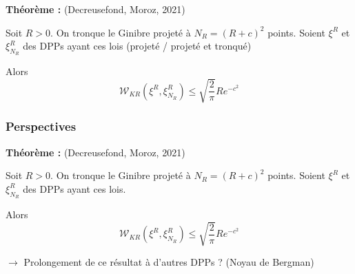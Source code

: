 \documentclass{beamer}
\begin{document}
\begin{frame}
    \bigskip

    \textbf{Théorème :} (Decreusefond, Moroz, 2021)
    
    Soit $R > 0$. On tronque le Ginibre projeté à $ N_R = (R+c)^2 $ points. Soient $ \xi^R $ et $ \xi^R_{N_R} $ des DPPs ayant ces lois (projeté / projeté et tronqué)

    Alors $$ \mathcal W_{KR}(\xi^R, \xi^R_{N_R}) \leqslant \sqrt{\frac{2}{\pi}} R e^{-c^2} $$

\end{frame}\begin{frame}\frametitle{Perspectives}

    \textbf{Théorème :} (Decreusefond, Moroz, 2021)
    
    Soit $R > 0$. On tronque le Ginibre projeté à $ N_R = (R+c)^2 $ points. Soient $ \xi^R $ et $ \xi^R_{N_R} $ des DPPs ayant ces lois.

    Alors $$ \mathcal W_{KR}(\xi^R, \xi^R_{N_R}) \leqslant \sqrt{\frac{2}{\pi}} R e^{-c^2} $$

    \bigskip $\rightarrow$ Prolongement de ce résultat à d'autres DPPs ? (Noyau de Bergman)













\end{frame}
\end{document}

